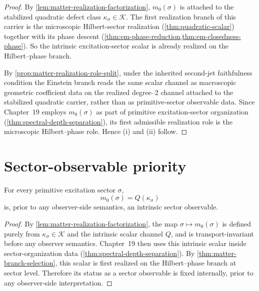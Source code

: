 \begin{proof}
By \cref{lem:matter-realization-factorization},
\(m_0(\sigma)\) is attached to the stabilized quadratic defect class
\(\kappa_\sigma\in\mathcal K\).
The first realization branch of this carrier is the microscopic
Hilbert-sector realization (\cref{thm:quadratic-scalar}) together with its
phase descent (\cref{thm:em-phase-reduction,thm:em-closedness-phase}).
So the intrinsic excitation-sector scalar is already realized on the
Hilbert--phase branch.

By \cref{prop:matter-realization-role-split}, under the inherited
second-jet faithfulness condition the Einstein branch reads the same
scalar channel as macroscopic geometric coefficient data on the
realized degree--\(2\) channel attached to the stabilized quadratic
carrier, rather than as primitive-sector observable data.
Since Chapter~19 employs
\(m_0(\sigma)\) as part of primitive excitation-sector organization
(\cref{thm:spectral-depth-separation}), its first admissible realization
role is the microscopic Hilbert--phase role.
Hence \textup{(i)} and \textup{(ii)} follow.
\end{proof}

\section{Sector-observable priority}
\label{sec:matter-realization-priority}

\begin{theorem}
\label{thm:sector-observable-priority}
\label{thm:sector-observable}
For every primitive excitation sector \(\sigma\),
\[
  m_0(\sigma)=Q(\kappa_\sigma)
\]
is, prior to any observer-side semantics, an intrinsic sector observable.
\end{theorem}

\begin{proof}
By \cref{lem:matter-realization-factorization}, the map
\(\sigma\mapsto m_0(\sigma)\) is defined purely from
\(\kappa_\sigma\in\mathcal K\) and the intrinsic scalar channel \(Q\), and
is transport-invariant before any observer semantics.
Chapter~19 then uses this intrinsic scalar inside sector-organization data
(\cref{thm:spectral-depth-separation}).
By \cref{thm:matter-branch-selection}, this scalar is first realized on the
Hilbert--phase branch at sector level.
Therefore its status as a sector observable is fixed internally, prior to
any observer-side interpretation.
\end{proof}

